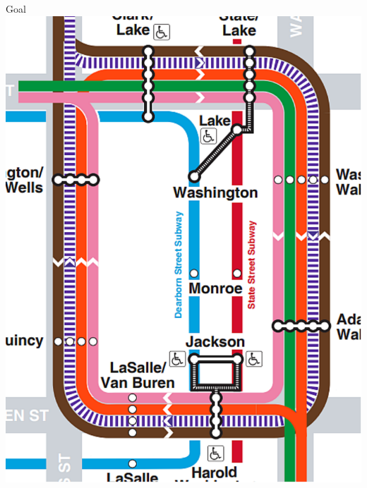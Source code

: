 \documentclass{beamer}
\begin{document}
\begin{frame}{Goal}
	\includegraphics[width=0.25\paperwidth]{figures/chicago_loop.pdf}

\end{frame}
\end{document}
